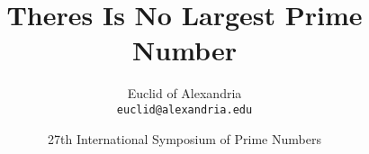 






\documentclass{beamer}












\title{Theres Is No Largest Prime Number}

\author[Euclid]{Euclid of Alexandria \\
  \texttt{euclid@alexandria.edu}}

\date[ISPN '80]{27th International Symposium of Prime Numbers}




\begin{frame}

  \titlepage

\end{frame}





\begin{frame}
  \frametitle{Outline}


  \tableofcontents

\end{frame}





